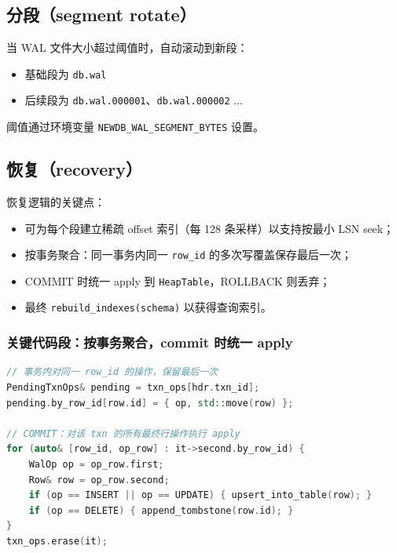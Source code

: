 \subsection{分段（segment rotate）}

当 WAL 文件大小超过阈值时，自动滚动到新段：

\begin{itemize}
  \item 基础段为 \texttt{db.wal}
  \item 后续段为 \texttt{db.wal.000001}、\texttt{db.wal.000002} ...
\end{itemize}

阈值通过环境变量 \texttt{NEWDB\_WAL\_SEGMENT\_BYTES} 设置。

\subsection{恢复（recovery）}

恢复逻辑的关键点：

\begin{itemize}
  \item 可为每个段建立稀疏 offset 索引（每 128 条采样）以支持按最小 LSN seek；
  \item 按事务聚合：同一事务内同一 \texttt{row\_id} 的多次写覆盖保存最后一次；
  \item COMMIT 时统一 apply 到 \texttt{HeapTable}，ROLLBACK 则丢弃；
  \item 最终 \texttt{rebuild\_indexes(schema)} 以获得查询索引。
\end{itemize}

\subsubsection{关键代码段：按事务聚合，commit 时统一 apply}

\begin{lstlisting}[language=C++,caption={recover：PendingTxnOps + COMMIT apply（节选）}]
// 事务内对同一 row_id 的操作，保留最后一次
PendingTxnOps& pending = txn_ops[hdr.txn_id];
pending.by_row_id[row.id] = { op, std::move(row) };

// COMMIT：对该 txn 的所有最终行操作执行 apply
for (auto& [row_id, op_row] : it->second.by_row_id) {
    WalOp op = op_row.first;
    Row& row = op_row.second;
    if (op == INSERT || op == UPDATE) { upsert_into_table(row); }
    if (op == DELETE) { append_tombstone(row.id); }
}
txn_ops.erase(it);
\end{lstlisting}

